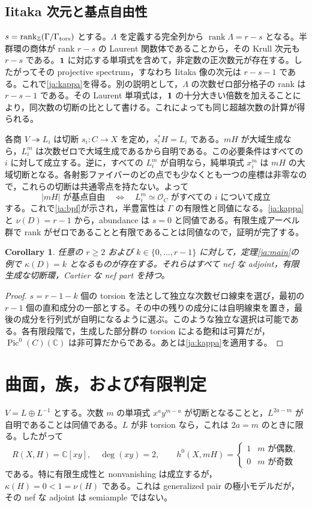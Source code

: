 \documentclass[12pt]{amsart}
\newtheorem{cor}[thm]{Corollary}
\theoremstyle{definition}
\theoremstyle{remark}
\numberwithin{equation}{section}
\newcommand{\rank}{\operatorname{rank}}
\newcommand{\cO}{\mathcal{O}}
\newcommand{\Z}{\mathbb{Z}}
\newcommand{\C}{\mathbb{C}}
\DeclareMathOperator{\Pic}{Pic}
\begin{document}
\subsection{Iitaka 次元と基点自由性}
$s=\rank_\Z(\Gamma/\Gamma_{\rm tors})$ とする。$\Lambda$ を定義する完全列から $\rank\Lambda=r-s$ となる。半群環の商体が rank $r-s$ の Laurent 関数体であることから，その Krull 次元も $r-s$ である。${\bf1}$ に対応する単項式を含めて，非定数の正次数元が存在する。したがってその projective spectrum，すなわち Iitaka 像の次元は $r-s-1$ である。これで\eqref{ja:kappa}を得る。別の説明として，$\Lambda$ の次数ゼロ部分格子の rank は $r-s-1$ である。その Laurent 単項式は，${\bf1}$ の十分大きい倍数を加えることにより，同次数の切断の比として書ける。これによっても同じ超越次数の計算が得られる。

各商 $V\twoheadrightarrow L_i$ は切断 $s_i:C\to X$ を定め，$s_i^*H=L_i$ である。$mH$ が大域生成なら，$L_i^m$ は次数ゼロで大域生成であるから自明である。この必要条件はすべての $i$ に対して成立する。逆に，すべての $L_i^m$ が自明なら，純単項式 $x_i^m$ は $mH$ の大域切断となる。各射影ファイバーのどの点でも少なくとも一つの座標は非零なので，これらの切断は共通零点を持たない。よって
\[
 |mH|\text{ が基点自由}\quad\Longleftrightarrow\quad
 L_i^m\simeq\cO_C\text{ がすべての }i\text{ について成立}
\]
する。これで\eqref{ja:bpf}が示され，半豊富性は $\Gamma$ の有限性と同値になる。\eqref{ja:kappa}と $\nu(D)=r-1$ から，abundance は $s=0$ と同値である。有限生成アーベル群で rank がゼロであることと有限であることは同値なので，証明が完了する。

\begin{cor}\label{ja:allkappa}
任意の $r\geq2$ および $k\in\{0,\ldots,r-1\}$ に対して，定理\ref{ja:main}の例で $\kappa(D)=k$ となるものが存在する。それらはすべて nef な adjoint，有限生成な切断環，Cartier な nef part を持つ。
\end{cor}
\begin{proof}
$s=r-1-k$ 個の torsion を法として独立な次数ゼロ線束を選び，最初の $r-1$ 個の直和成分の一部とする。その中の残りの成分には自明線束を置き，最後の成分を行列式が自明になるように選ぶ。このような独立な選択は可能である。各有限段階で，生成した部分群の torsion による飽和は可算だが，$\Pic^0(C)(\C)$ は非可算だからである。あとは\eqref{ja:kappa}を適用する。
\end{proof}

\section{曲面，族，および有限判定}\label{ja:surface}
$V=L\oplus L^{-1}$ とする。次数 $m$ の単項式 $x^ay^{m-a}$ が切断となることと，$L^{2a-m}$ が自明であることは同値である。$L$ が非 torsion なら，これは $2a=m$ のときに限る。したがって
\begin{equation}\label{ja:non-torsion}
 R(X,H)=\C[xy],\quad\deg(xy)=2,\qquad
 h^0(X,mH)=\begin{cases}1&m\text{ が偶数},\\0&m\text{ が奇数}\end{cases}
\end{equation}
である。特に有限生成性と nonvanishing は成立するが，$\kappa(H)=0<1=\nu(H)$ である。これは generalized pair の極小モデルだが，その nef な adjoint は semiample ではない。
\end{document}
